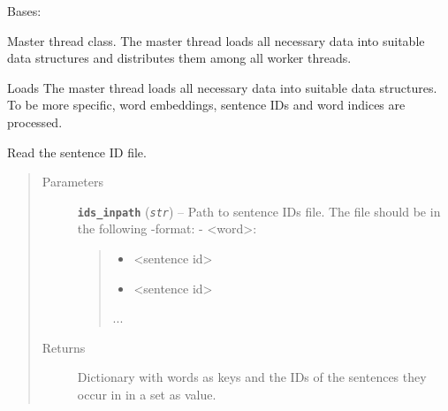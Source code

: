 \documentclass[letterpaper,10pt,english]{sphinxmanual}
\begin{document}
\begin{fulllineitems}
\label{src.mapping:src.mapping.mapthreading.MappingMasterThread}
Bases: 

Master thread class. The master thread loads all necessary data into suitable data structures and distributes
them among all worker threads.

\begin{fulllineitems}
\label{src.mapping:src.mapping.mapthreading.MappingMasterThread.prepare}
Loads The master thread loads all necessary data into suitable data structures. To be more specific,
word embeddings, sentence IDs and word indices are processed.

\end{fulllineitems}


\begin{fulllineitems}
\label{src.mapping:src.mapping.mapthreading.MappingMasterThread.read_ids_file}
Read the sentence ID file.
\begin{quote}\begin{description}
\item[{Parameters}] \leavevmode
\textbf{\texttt{ids\_inpath}} (\emph{\texttt{str}}) -- 
Path to sentence IDs file. The file should be in the following -format:
- \textless{}word\textgreater{}:
\begin{quote}
\begin{itemize}
\item {} 
\textless{}sentence id\textgreater{}

\item {} 
\textless{}sentence id\textgreater{}

\end{itemize}

...
\end{quote}


\item[{Returns}] \leavevmode
Dictionary with words as keys and the IDs of the sentences they occur in in a set as value.


\end{description}
\end{quote}
\end{fulllineitems}
\end{fulllineitems}
\end{document}
